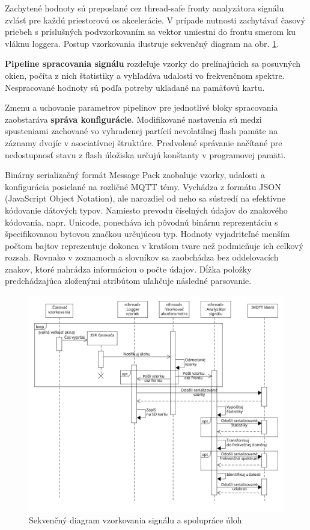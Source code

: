 Zachytené hodnoty sú preposlané cez thread-safe fronty analyzátora signálu zvlásť pre každú priestorovú os akcelerácie. 
V prípade nutnosti zachytávať časový priebeh s príslušných podvzorkovaním sa vektor umiestni do frontu smerom ku vláknu loggera. 
Postup vzorkovania ilustruje sekvenčný diagram na obr. \ref{uml:sequence}.

\textbf{Pipeline spracovania signálu} rozdeľuje vzorky do prelínajúcich sa posuvných okien, počíta z nich štatistiky a vyhľadáva udalosti vo 
frekvenčnom spektre. Nespracované hodnoty sú podľa potreby ukladané na pamäťovú kartu. 

Zmenu a uchovanie parametrov pipelinov pre jednotlivé bloky spracovania zaobstaráva \textbf{správa konfigurácie}. Modifikované nastavenia sú 
medzi spusteniami zachované vo vyhradenej partícií nevolatilnej flash pamäte na záznamy dvojíc v asociatívnej štruktúre. Predvolené 
správanie načítané pre nedostupnosť stavu z flash úložiska určujú konštanty v programovej pamäti.

Binárny serializačný formát Message Pack zaobaluje vzorky, udalosti a konfigurácia posielané na rozličné MQTT témy. Vychádza z 
formátu JSON (JavaScript Object Notation), ale narozdiel od neho sa sústredí na efektívne kódovanie dátových typov. Namiesto prevodu 
číselných údajov do znakového kódovania, napr. Unicode, ponecháva ich pôvodnú binárnu reprezentáciu s špecifikovanou bytovou značkou 
určujúcou typ. Hodnoty vyjadriteľné menším počtom bajtov reprezentuje dokonca v kratšom tvare než podmieňuje ich celkový rozsah.
Rovnako v zoznamoch a slovníkov sa  zaobchádza bez oddelovacích znakov, ktoré nahrádza informáciou o počte údajov. Dĺžka 
položky predchádzajúca zloženými atribútom uľahčuje následné parsovanie.

\begin{figure}[h]
	\centering
	\includegraphics[width=\textwidth]{figures/design/tasks.png}
	\caption{Sekvenčný diagram vzorkovania signálu a spolupráce úloh}
	\label{uml:sequence}
\end{figure}


